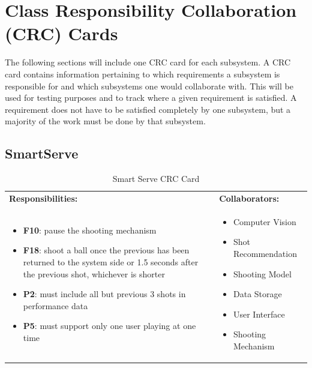 \documentclass[11pt]{article}
\begin{document}
\section{Class Responsibility Collaboration (CRC) Cards}
The following sections will include one CRC card for each subsystem. A CRC card contains information pertaining to which requirements a subsystem is responsible for and which subsystems one would collaborate with. This will be used for testing purposes and to track where a given requirement is satisfied. A requirement does not have to be satisfied completely by one subsystem, but a majority of the work must be done by that subsystem.
\subsection{SmartServe}

\begin{table}[H]
\centering
\label{my-label}
\begin{tabular}{ | >{\raggedright\arraybackslash}p{} | >{\raggedright\arraybackslash}p{} | }
\hline
\multicolumn{2}{|c|}{\textbf{Smart Serve}}             \\ \hline
\textbf{Responsibilities:} & \textbf{Collaborators:} \\ \hline
\begin{itemize}
\item \textbf{F10}: pause the shooting mechanism
\item \textbf{F18}: shoot a ball once the previous has been returned to the system side or 1.5 seconds after the previous shot, whichever is shorter
\item \textbf{P2}:  must include all but previous 3 shots in performance data
\item \textbf{P5}: must support only one user playing at one time
\end{itemize}
&
\begin{itemize}
\item Computer Vision
\item Shot Recommendation
\item Shooting Model
\item Data Storage
\item User Interface
\item Shooting Mechanism
\end{itemize} \\ \hline
\end{tabular}
\caption{Smart Serve CRC Card}
\end{table}
\end{document}
